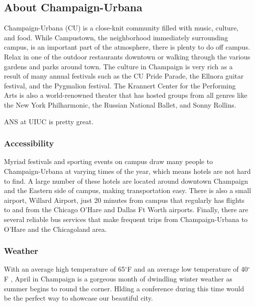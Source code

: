 \documentclass[11pt, letterpaper]{article}
\begin{document}
\subsection{About Champaign-Urbana}
Champaign-Urbana (CU) is a close-knit community filled with music, culture, and food. While Campustown, the neighborhood immediately surrounding campus,  is an important part of the atmosphere, there is plenty to do off campus. Relax in one of the outdoor restaurants downtown or walking through the various gardens and parks around town. The culture in Champaign is very rich as a result of many annual festivals such as the CU Pride Parade, the Ellnora guitar festival, and the Pygmalion festival. The Krannert Center for the Performing Arts is also a world-renowned theater that has hosted groups from all genres like the New York Philharmonic, the Russian National Ballet, and Sonny Rollins.

ANS at UIUC is pretty great.

\subsubsection{Accessibility}
Myriad festivals and sporting events on campus draw many people to Champaign-Urbana at varying times of the year, which means hotels are not hard to find. A large number of these hotels are located around downtown Champaign and the Eastern side of campus, making transportation easy. There is also a small airport, Willard Airport, just 20 minutes from campus that regularly has flights to and from the Chicago O’Hare and Dallas Ft Worth airports. Finally, there are several reliable bus services that make frequent trips from Champaign-Urbana to O’Hare and the Chicagoland area.

\subsubsection{Weather}
With an average high temperature of 65$^\circ$F and an average low temperature of 40$^\circ$F , April in Champaign is a gorgeous month of dwindling winter weather as summer begins to round the corner. Hlding a conference during this time would be the perfect way to showcase our beautiful city.
\end{document}
